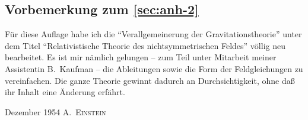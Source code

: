 \subsection*{Vorbemerkung zum \cref{sec:anh-2}}

Für diese Auflage habe ich die \enquote{Verallgemeinerung der Gravitationstheorie} unter dem Titel \enquote{Relativistische Theorie des nichtsymmetrischen Feldes} völlig neu bearbeitet. Es ist mir nämlich gelungen -- zum Teil unter Mitarbeit meiner Assistentin B.\ Kaufman -- die Ableitungen sowie die Form der Feldgleichungen zu vereinfachen. Die ganze Theorie gewinnt dadurch an Durchsichtigkeit, ohne daß ihr Inhalt eine Änderung erfährt.

Dezember 1954 \hfill A.\ \textsc{Einstein} \hspace{1.5em}
